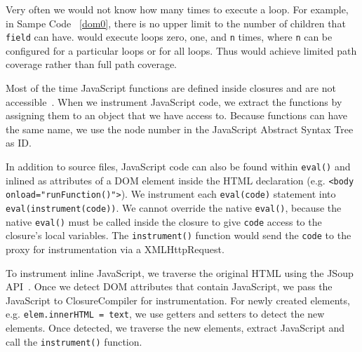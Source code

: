 Very often we would not know how many times to execute a loop.  For example, in Sampe Code ~\ref{dom0}, there is no upper limit to the number of children that {\tt field} can have.  
\tool would execute loops zero, one, and {\tt n} times, where {\tt n} can be configured for a particular loops or for all loops.  Thus \tool would achieve limited path coverage rather than full path coverage.  


Most of the time JavaScript functions are defined inside closures and are not accessible~\cite{privatefunctions}.  
When we instrument JavaScript code, we extract the functions by assigning them to an object that we have access to.  Because functions can have the same name, we use the node number in the JavaScript Abstract Syntax Tree as ID.


In addition to source files, JavaScript code can also be found within {\tt eval()} and inlined as attributes of a DOM element inside the HTML declaration (e.g. {\tt <body onload="runFunction()">}).
We instrument each {\tt eval(code)} statement into {\tt eval(instrument(code))}.  We cannot override the native {\tt eval()}, because the native {\tt eval()} must be called inside the closure to give {\tt code} access to the closure's local variables.  
The {\tt instrument()} function would send the {\tt code} to the proxy for instrumentation via a XMLHttpRequest.  

To instrument inline JavaScript, we traverse the original HTML using the JSoup API~\cite{jsoup}.  Once we detect DOM attributes that contain JavaScript, we pass the JavaScript to ClosureCompiler for instrumentation.  
For newly created elements, e.g. {\tt elem.innerHTML = text}, we use getters and setters to detect the new elements.  Once detected, we traverse the new elements, extract JavaScript and call the {\tt instrument()} function.  

